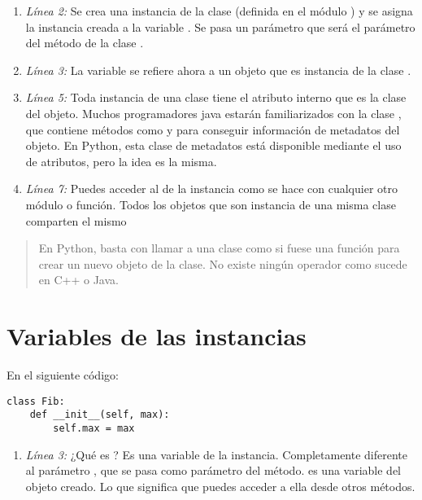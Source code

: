 \begin{enumerate}

\item \emph{Línea 2:} Se crea una instancia de la clase  (definida en el módulo ) y se asigna la instancia creada a la variable . Se pasa un parámetro que será el parámetro  del método  de la clase .

\item \emph{Línea 3:} La variable  se refiere ahora a un objeto que es instancia de la clase .

\item \emph{Línea 5:} Toda instancia de una clase tiene el atributo interno  que es la clase del objeto. Muchos programadores java estarán familiarizados con la clase , que contiene métodos como  y  para conseguir información de metadatos del objeto. En Python, esta clase de metadatos está disponible mediante el uso de atributos, pero la idea es la misma.

\item \emph{Línea 7:} Puedes acceder al  de la instancia como se hace con cualquier otro módulo o función. Todos los objetos que son instancia de una misma clase comparten el mismo 

\end{enumerate}

\begin{quote}
En Python, basta con llamar a una clase como si fuese una función para crear un nuevo objeto de la clase. No existe ningún operador  como sucede en C++ o Java.
\end{quote}

\section{Variables de las instancias}

En el siguiente código:

\noindent\begin{minipage}{\textwidth}
\begin{lstlisting}[mathescape=True]
class Fib:
    def __init__(self, max):
        self.max = max
\end{lstlisting}
\end{minipage}

\begin{enumerate}

\item \emph{Línea 3:} ¿Qué es ? Es una variable de la instancia. Completamente diferente al parámetro , que se pasa como parámetro del método.  es una variable del objeto creado. Lo que significa que puedes acceder a ella desde otros métodos.

\end{enumerate}

